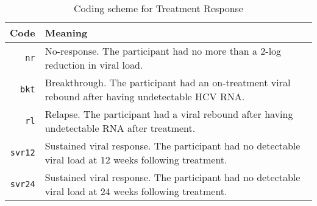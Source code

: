 \begin{table}[h]
  \caption{Coding scheme for Treatment Response}
  \label{tbl:cause-of-death}
  \begin{tabular}{rp{8cm}}
    Code                & Meaning \\ \hline
    \texttt{nr}         & No-response. The participant had no more than a 2-log reduction in viral load. \\
    \texttt{bkt}        & Breakthrough. The participant had an on-treatment viral rebound after having undetectable HCV RNA. \\
    \texttt{rl}         & Relapse. The participant had a viral rebound after having undetectable RNA after treatment. \\
    \texttt{svr12}      & Sustained viral response. The participant had no detectable viral load at 12 weeks following treatment. \\
    \texttt{svr24}      & Sustained viral response. The participant had no detectable viral load at 24 weeks following treatment. \\
  \end{tabular}
\end{table}
